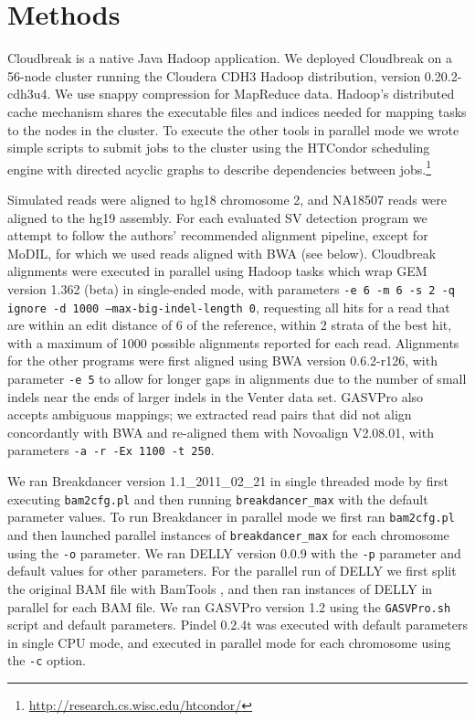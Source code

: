 \documentclass[11pt]{article}
\begin{document}
\section{Methods}\label{discussion}

Cloudbreak is a native Java Hadoop application. We deployed Cloudbreak on a 56-node cluster running the Cloudera CDH3 Hadoop distribution, version 0.20.2-cdh3u4. We use snappy compression for MapReduce data. Hadoop's distributed cache mechanism shares the executable files and indices needed for mapping tasks to the nodes in the cluster. To execute the other tools in parallel mode we wrote simple scripts to submit jobs to the cluster using the HTCondor scheduling engine with directed acyclic graphs to describe dependencies between jobs.\footnote{\url{http://research.cs.wisc.edu/htcondor/}}

Simulated reads were aligned to hg18 chromosome 2, and NA18507 reads were aligned to the hg19 assembly. For each evaluated SV detection program we attempt to follow the authors' recommended alignment pipeline, except for MoDIL, for which we used reads aligned with BWA (see below). Cloudbreak alignments were executed in parallel using Hadoop tasks which wrap GEM version 1.362 (beta) in single-ended mode, with parameters \texttt{-e 6 -m 6 -s 2 -q ignore -d 1000 --max-big-indel-length 0},  requesting all hits for a read that are within an edit distance of 6 of the reference, within 2 strata of the best hit, with a maximum of 1000 possible alignments reported for each read. Alignments for the other programs were first aligned using BWA \autocite{Li:2009p836} version 0.6.2-r126, with parameter \texttt{-e 5} to allow for longer gaps in alignments due to the number of small indels near the ends of larger indels in the Venter data set. GASVPro also accepts ambiguous mappings; we extracted read pairs that did not align concordantly with BWA and re-aligned them with Novoalign V2.08.01, with parameters \texttt{-a -r -Ex 1100 -t 250}. 

We ran Breakdancer version 1.1\_2011\_02\_21 in single threaded mode by first executing \texttt{bam2cfg.pl} and then running \texttt{breakdancer\_max} with the default parameter values.  To run Breakdancer in parallel mode we first ran \texttt{bam2cfg.pl} and then launched parallel instances of \texttt{breakdancer\_max} for each chromosome using the \texttt{-o} parameter. We ran DELLY version 0.0.9 with the \texttt{-p} parameter and default values for other parameters. For the parallel run of DELLY we first split the original BAM file with BamTools \autocite{Barnett:2011hm}, and then ran instances of DELLY in parallel for each BAM file. We ran GASVPro version 1.2 using the \texttt{GASVPro.sh} script and default parameters. Pindel 0.2.4t was executed with default parameters in single CPU mode, and executed in parallel mode for each chromosome using the \texttt{-c} option.
\end{document}
